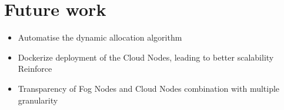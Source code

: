 \chapter{Future work} \label{chap:future}

\begin{itemize}
    \item Automatise the dynamic allocation algorithm
    \item Dockerize deployment of the Cloud Nodes, leading to better scalability  Reinforce
    \item Transparency of Fog Nodes and Cloud Nodes combination with multiple granularity  
\end{itemize}
 

